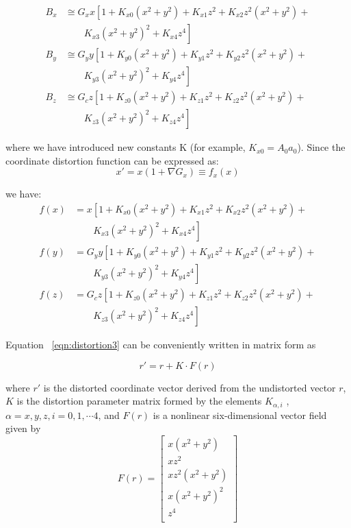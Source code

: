 \begin{align}
  B_x &\cong G_x x \left[ 1 + K_{x0}(x^2 + y^2) + K_{x1}z^2 + K_{x2}z^2(x^2 + y^2) + \right. \nonumber \\
      &\qquad \left. K_{x3}(x^2 + y^2)^2 + K_{x4}z^4 \right] \nonumber \\
  B_y &\cong G_y y \left[ 1 + K_{y0}(x^2 + y^2) + K_{y1}z^2 + K_{y2}z^2(x^2 + y^2) + \right. \nonumber \\
      &\qquad \left. K_{y3}(x^2 + y^2)^2 + K_{y4}z^4 \right] \label{eqn:distortion2}\\
  B_z &\cong G_c z \left[ 1 + K_{z0}(x^2 + y^2) + K_{z1}z^2 + K_{z2}z^2(x^2 + y^2) + \right. \nonumber \\
      &\qquad \left. K_{z3}(x^2 + y^2)^2 + K_{z4}z^4 \right] \nonumber
\end{align}

where we have introduced new constants K (for example, $K_{x0} = A_0 a_0$). Since the coordinate distortion function can be expressed as:
\begin{equation}
  x' = x(1 + \nabla G_x) \equiv f_x(x)
\end{equation}

we have: 
\begin{align}
  f(x) &= x \left[ 1 + K_{x0}(x^2 + y^2) + K_{x1}z^2 + K_{x2}z^2(x^2 + y^2) + \right. \nonumber \\
  &\qquad \left. K_{x3}(x^2 + y^2)^2 + K_{x4}z^4 \right] \nonumber \\
  f(y) &= G_y y \left[ 1 + K_{y0}(x^2 + y^2) + K_{y1}z^2 + K_{y2}z^2(x^2 + y^2) + \right. \nonumber \\
      &\qquad \left. K_{y3}(x^2 + y^2)^2 + K_{y4}z^4 \right] \label{eqn:distortion3} \\
  f(z) &= G_c z \left[ 1 + K_{z0}(x^2 + y^2) + K_{z1}z^2 + K_{z2}z^2(x^2 + y^2) + \right. \nonumber \\
      &\qquad \left. K_{z3}(x^2 + y^2)^2 + K_{z4}z^4 \right] \nonumber
\end{align}

Equation ~\ref{eqn:distortion3} can be conveniently written in matrix form as

\begin{equation}
  r' = r + K \cdot F(r)
\end{equation}

where $r'$ is the distorted coordinate vector derived from the undistorted vector $r$, $K$ is the distortion parameter matrix formed by the elements $K_{α,i}$ , $\alpha = x, y, z, i = 0,1,\cdots 4$, and $F(r)$ is a nonlinear six-dimensional vector field given by
\begin{equation}
  F(r) = 
  \begin{bmatrix}
    x(x^2 + y^2) \\
    xz^2 \\
    xz^2(x^2 + y^2) \\
    x(x^2 + y^2)^2 \\
    z^4 \\
  \end{bmatrix} 
\end{equation}

